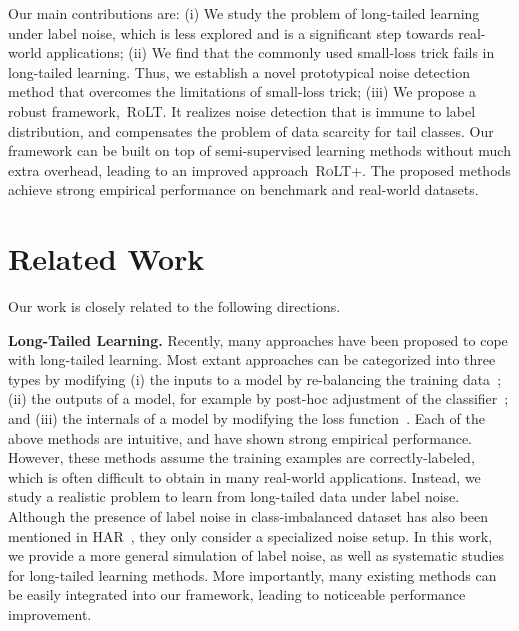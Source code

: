 \documentclass{article}
\def\algo{{\textsc{RoLT}}}
\begin{document}
Our main contributions are: (i) We study the problem of long-tailed learning under label noise, which is less explored and is a significant step towards real-world applications; (ii) We find that the commonly used small-loss trick fails in long-tailed learning. Thus, we establish a novel prototypical noise detection method that overcomes the limitations of small-loss trick; (iii) We propose a robust framework,~\algo. It realizes noise detection that is immune to label distribution, and compensates the problem of data scarcity for tail classes. 
Our framework can be built on top of semi-supervised learning methods without much extra overhead, leading to an improved approach~\algo+. The proposed methods achieve strong empirical performance on benchmark and real-world datasets.



\section{Related Work}
Our work is closely related to the following directions.

\textbf{Long-Tailed Learning.} Recently, many approaches have been proposed to cope with long-tailed learning. Most extant approaches can be categorized into three types by modifying (i) the inputs to a model by re-balancing the training data~\cite{DBLP:conf/eccv/ShenLH16,DBLP:conf/cvpr/0002MZWGY19,DBLP:conf/cvpr/ZhouCWC20bbn}; (ii) the outputs of a model, for example by post-hoc adjustment of the classifier~\cite{DBLP:conf/iclr/KangXRYGFK20,tang2020tde,menon2021logitadjust}; and (iii) the internals of a model by modifying the loss function~\cite{DBLP:conf/nips/CaoWGAM19ldam,DBLP:conf/nips/ShuXY0ZXM19,jamal2020rethinking,DBLP:conf/nips/RenYSMZYL20}. Each of the above methods are intuitive, and have shown strong empirical performance. However, these methods assume the training examples are correctly-labeled, which is often difficult to obtain in many real-world applications. Instead, we study a realistic problem to learn from long-tailed data under label noise. Although the presence of label noise in class-imbalanced dataset has also been mentioned in HAR~\cite{cao2021heteroskedastic}, they only consider a specialized noise setup. In this work, we provide a more general simulation of label noise, as well as systematic studies for long-tailed learning methods. More importantly, many existing methods can be easily integrated into our framework, leading to noticeable performance improvement.
\end{document}
